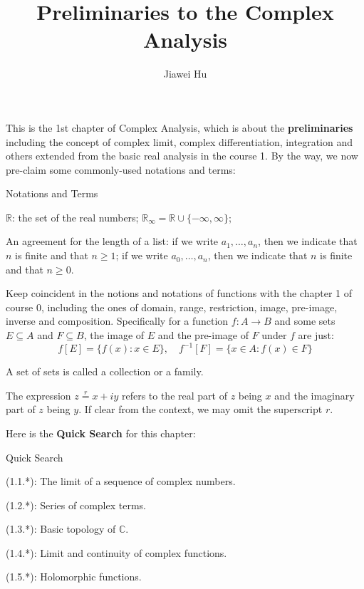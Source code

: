 \documentclass{article}
\title{\LARGE \textbf{Preliminaries to the Complex Analysis}}
\author{\large Jiawei Hu}
\begin{document}
\maketitle

This is the 1st chapter of Complex Analysis, which is about the \textbf{preliminaries} including the concept of complex limit, complex differentiation, integration and others extended from the basic real analysis in the course 1. By the way, we now pre-claim some commonly-used notations and terms:
\begin{Df}{Notations and Terms}
    \begin{compactenum}
        \item $\mathbb{R}$: the set of the real numbers; $\mathbb{R}_\infty = \mathbb{R}\cup\{-\infty, \infty\}$;
        \item An agreement for the length of a list: if we write $a_1, \dots, a_n$, then we indicate that $n$ is finite and that $n\geq 1$; if we write $a_0, \dots, a_n$, then we indicate that $n$ is finite and that $n\geq 0$.
        \item Keep coincident in the notions and notations of functions with the chapter 1 of course 0, including the ones of domain, range, restriction, image, pre-image, inverse and composition. Specifically for a function $f: A\rightarrow B$ and some sets $E\subseteq A$ and $F\subseteq B$, the image of $E$ and the pre-image of $F$ under $f$ are just:
        $$f[E] = \{f(x): x\in E\},\quad f^{-1}[F] = \{x\in A: f(x)\in F\}$$
        \item A set of sets is called a collection or a family.
        \item The expression $z\overset{r}{=}x+iy$ refers to the real part of $z$ being $x$ and the imaginary part of $z$ being $y$. If clear from the context, we may omit the superscript $r$.
    \end{compactenum}
\end{Df}

Here is the \textbf{Quick Search} for this chapter:
\begin{Th}{Quick Search}
    \begin{compactdesc}
        \item (1.1.*): The limit of a sequence of complex numbers.
        \item (1.2.*): Series of complex terms.
        \item (1.3.*): Basic topology of $\mathbb{C}$.
        \item (1.4.*): Limit and continuity of complex functions.
        \item (1.5.*): Holomorphic functions.
    \end{compactdesc}
\end{Th}
\end{document}
